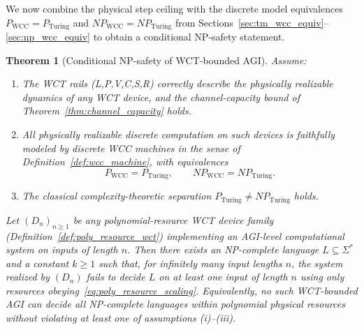 \documentclass[12pt]{article}
\newtheorem{theorem}{Theorem}[section]
\begin{document}
We now combine the physical step ceiling with the discrete model equivalences
$P_{\mathrm{WCC}} = P_{\mathrm{Turing}}$ and
$NP_{\mathrm{WCC}} = NP_{\mathrm{Turing}}$ from
Sections~\ref{sec:tm_wcc_equiv}--\ref{sec:np_wcc_equiv} to obtain a
conditional NP-safety statement.

\begin{theorem}[Conditional NP-safety of WCT-bounded AGI]
\label{thm:conditional_np_safety}
Assume:
\begin{enumerate}[label=(\roman*)]
  \item The WCT rails (L,P,V,C,S,R) correctly describe the physically
        realizable dynamics of any WCT device, and the channel-capacity
        bound of Theorem~\ref{thm:channel_capacity} holds.
  \item All physically realizable discrete computation on such devices is
        faithfully modeled by discrete WCC machines in the sense of
        Definition~\ref{def:wcc_machine}, with equivalences
        \[
        P_{\mathrm{WCC}} = P_{\mathrm{Turing}},\qquad
        NP_{\mathrm{WCC}} = NP_{\mathrm{Turing}}.
        \]
  \item The classical complexity-theoretic separation
        $P_{\mathrm{Turing}} \neq NP_{\mathrm{Turing}}$ holds.
\end{enumerate}
Let $(D_n)_{n\ge 1}$ be any polynomial-resource WCT device family
(Definition~\ref{def:poly_resource_wct}) implementing an AGI-level
computational system on inputs of length $n$. Then there exists an
NP-complete language $L \subseteq \Sigma^*$ and a constant $k \ge 1$ such that, for infinitely many input lengths $n$, the system realized by $(D_n)$
\emph{fails} to decide $L$ on at least one input of length $n$ using only resources
obeying~\eqref{eq:poly_resource_scaling}.
Equivalently, no such WCT-bounded AGI can decide all NP-complete languages
within polynomial physical resources without violating at least one of
assumptions (i)--(iii).
\end{theorem}
\end{document}
